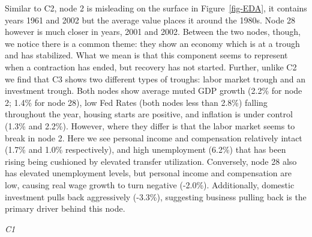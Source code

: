\documentclass[
  10pt,
  letterpaper,
  DIV=11,
  numbers=noendperiod]{scrartcl}
\begin{document}
Similar to C2, node 2 is misleading on the surface in
Figure~\ref{fig-EDA}, it contains years 1961 and 2002 but the average
value places it around the 1980s. Node 28 however is much closer in
years, 2001 and 2002. Between the two nodes, though, we notice there is
a common theme: they show an economy which is at a trough and has
stabilized. What we mean is that this component seems to represent when
a contraction has ended, but recovery has not started. Further, unlike
C2 we find that C3 shows two different types of troughs: labor market
trough and an investment trough. Both nodes show average muted GDP
growth (2.2\% for node 2; 1.4\% for node 28), low Fed Rates (both nodes
less than 2.8\%) falling throughout the year, housing starts are
positive, and inflation is under control (1.3\% and 2.2\%). However,
where they differ is that the labor market seems to break in node 2.
Here we see personal income and compensation relatively intact (1.7\%
and 1.0\% respectively), and high unemployment (6.2\%) that has been
rising being cushioned by elevated transfer utilization. Conversely,
node 28 also has elevated unemployment levels, but personal income and
compensation are low, causing real wage growth to turn negative
(-2.0\%). Additionally, domestic investment pulls back aggressively
(-3.3\%), suggesting business pulling back is the primary driver behind
this node.

\emph{C1}
\end{document}
